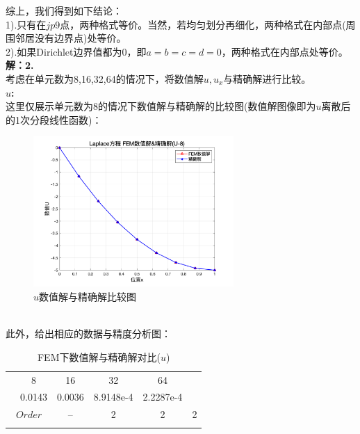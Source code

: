 \documentclass[a4paper,11pt,UTF8]{article}%
\theoremstyle{plain}
\begin{document}
	综上，我们得到如下结论：\\
	1).只有在$jp9$点，两种格式等价。当然，若均匀划分再细化，两种格式在内部点(周围邻居没有边界点)处等价。\\
	2).如果Dirichlet边界值都为0，即$a=b=c=d=0$，两种格式在内部点处等价。
\clearpage
\noindent \textbf{解：2.}\\
\indent 考虑在单元数为8,16,32,64的情况下，将数值解$u,u_x$与精确解进行比较。\\
\textbf{$u$:}\\
\indent 这里仅展示单元数为8的情况下数值解与精确解的比较图(数值解图像即为$u$离散后的1次分段线性函数)：
			\begin{figure}[H]
	\centering
	\includegraphics[width=3in]{U8.png} 
	\caption{$u$数值解与精确解比较图}
\end{figure}\leavevmode\\
此外，给出相应的数据与精度分析图：\\
		\begin{table}[H]
	\centering
	\caption{FEM下数值解与精确解对比($u$)}
	\label{tbl:table1}
	\begin{tabular}{cccccc}
		\Xhline{2pt}
		\multicolumn{2}{c}{Nelement}& 8& 16& 32& 64 \\
		\Xhline{0.5pt}
		
		
		\multicolumn{2}{c}{$L_2errors-{U}$}& 0.0143& 0.0036& 8.9148e-4& 2.2287e-4\\

		\multicolumn{2}{c}{$Order$}& --&2&2&2\\
		\Xhline{2pt}
	\end{tabular} 
\end{table}
\end{document}
